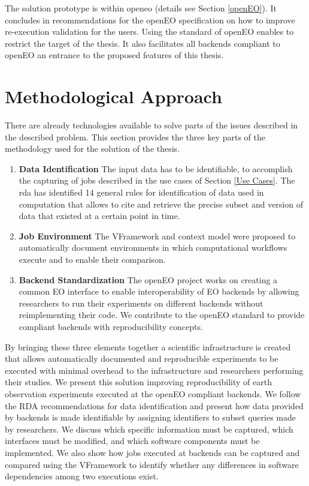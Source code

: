 \documentclass[draft,final]{vutinfth} %
\begin{document}
The solution prototype is within \gls{openeo} (details see Section \ref{openEO}). It concludes in recommendations for the openEO specification on how to improve re-execution validation for the users. Using the standard of openEO enables to restrict the target of the thesis. It also facilitates all backends compliant to openEO an entrance to the proposed features of this thesis. 

\section{Methodological Approach}\label{Method}
There are already technologies available to solve parts of the issues described in the described problem. This section provides the three key parts of the methodology used for the solution of the thesis.

\begin{enumerate}
	\item \textbf{Data Identification}
	The input data has to be identifiable, to accomplish the capturing of jobs described in the use cases of Section \ref{Use Cases}. The \gls{rda} has identified 14 general rules \cite{rauber2016identification} for identification of data used in computation that allows to cite and retrieve the precise subset and version of data that existed at a certain point in time.
	
	\item \textbf{Job Environment}
	The VFramework \cite{MiksaBiomedical} and context model \cite{MayerOntology} were proposed to automatically document environments in which computational workflows execute and to enable their comparison. 
		
	\item \textbf{Backend Standardization}
	The openEO project \cite{openeo} works on creating a common EO interface to enable interoperability of EO backends by allowing researchers to run their experiments on different backends without reimplementing their code. We contribute to the openEO standard to provide compliant backends with reproducibility concepts.
	
\end{enumerate}

By bringing these three elements together a scientific infrastructure is created that allows automatically documented and reproducible experiments to be executed with minimal overhead to the infrastructure and researchers performing their studies. We present this solution improving reproducibility of earth observation experiments executed at the openEO compliant backends. We follow the RDA recommendations for data identification and present how data provided by backends is made identifiable by assigning identifiers to subset queries made by researchers. We discuss which specific information must be captured, which interfaces must be modified, and which software components must be implemented. We also show how jobs executed at backends can be captured and compared using the VFramework to identify whether any differences in software dependencies among two executions exist.
\end{document}
